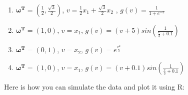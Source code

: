 \documentclass[12pt,]{krantz}
\theoremstyle{definition}
\theoremstyle{definition}
\theoremstyle{definition}
\theoremstyle{remark}
\begin{document}
\begin{enumerate}
\def\labelenumi{\arabic{enumi}.}
\item
  \(\mathbf{\omega^{T}}=(\frac{1}{2},\frac{\sqrt{3}}{2})\),
  \(v=\frac{1}{2}x_{1}+\frac{\sqrt{3}}{2}x_{2}\) ,
  \(g(v)=\frac{1}{1+e^{-v}}\)
\item
  \(\mathbf{\omega^{T}}=(1,0)\), \(v = x_1\),
  \(g(v)=(v+5)sin(\frac{1}{\frac{v}{3}+0.1})\)
\item
  \(\mathbf{\omega^{T}}=(0,1)\), \(v = x_2\), \(g(v)=e^{\frac{v^2}{5}}\)
\item
  \(\mathbf{\omega^{T}}=(1,0)\), \(v = x_1\),
  \(g(v)=(v+0.1)sin(\frac{1}{\frac{v}{3}+0.1})\)
\end{enumerate}

Here is how you can simulate the data and plot it using R:
\end{document}
